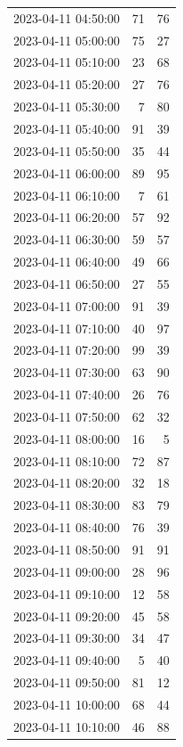 \documentclass[
  letterpaper,
  DIV=11,
  numbers=noendperiod]{scrartcl}
\begin{document}
\begin{tabular}{lrr}
2023-04-11 04:50:00 &    71 &    76 \\
2023-04-11 05:00:00 &    75 &    27 \\
2023-04-11 05:10:00 &    23 &    68 \\
2023-04-11 05:20:00 &    27 &    76 \\
2023-04-11 05:30:00 &     7 &    80 \\
2023-04-11 05:40:00 &    91 &    39 \\
2023-04-11 05:50:00 &    35 &    44 \\
2023-04-11 06:00:00 &    89 &    95 \\
2023-04-11 06:10:00 &     7 &    61 \\
2023-04-11 06:20:00 &    57 &    92 \\
2023-04-11 06:30:00 &    59 &    57 \\
2023-04-11 06:40:00 &    49 &    66 \\
2023-04-11 06:50:00 &    27 &    55 \\
2023-04-11 07:00:00 &    91 &    39 \\
2023-04-11 07:10:00 &    40 &    97 \\
2023-04-11 07:20:00 &    99 &    39 \\
2023-04-11 07:30:00 &    63 &    90 \\
2023-04-11 07:40:00 &    26 &    76 \\
2023-04-11 07:50:00 &    62 &    32 \\
2023-04-11 08:00:00 &    16 &     5 \\
2023-04-11 08:10:00 &    72 &    87 \\
2023-04-11 08:20:00 &    32 &    18 \\
2023-04-11 08:30:00 &    83 &    79 \\
2023-04-11 08:40:00 &    76 &    39 \\
2023-04-11 08:50:00 &    91 &    91 \\
2023-04-11 09:00:00 &    28 &    96 \\
2023-04-11 09:10:00 &    12 &    58 \\
2023-04-11 09:20:00 &    45 &    58 \\
2023-04-11 09:30:00 &    34 &    47 \\
2023-04-11 09:40:00 &     5 &    40 \\
2023-04-11 09:50:00 &    81 &    12 \\
2023-04-11 10:00:00 &    68 &    44 \\
2023-04-11 10:10:00 &    46 &    88 \\

\end{tabular}
\end{document}
